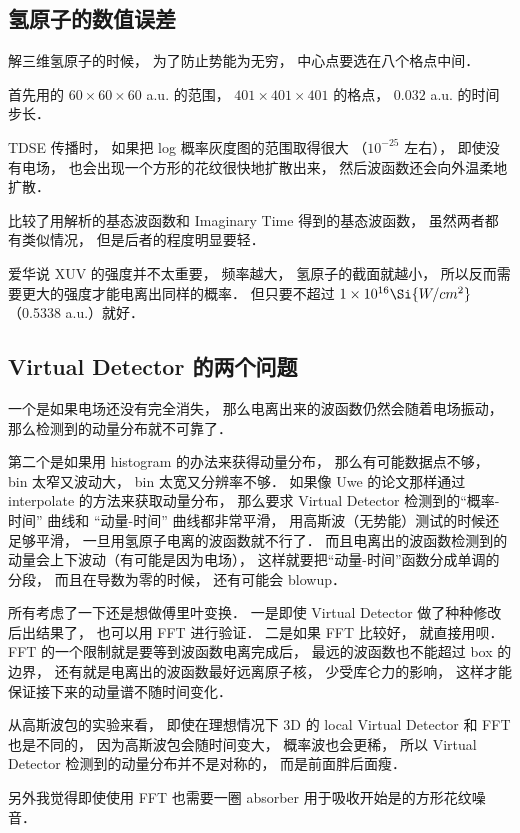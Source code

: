 
\subsection{氢原子的数值误差}
解三维氢原子的时候， 为了防止势能为无穷， 中心点要选在八个格点中间．

首先用的 $60\times 60\times 60$ a.u. 的范围， $401\times 401\times 401$ 的格点， $0.032$ a.u. 的时间步长．

TDSE 传播时， 如果把 log 概率灰度图的范围取得很大 （$10^{-25}$ 左右）， 即使没有电场， 也会出现一个方形的花纹很快地扩散出来， 然后波函数还会向外温柔地扩散．

比较了用解析的基态波函数和 Imaginary Time 得到的基态波函数， 虽然两者都有类似情况， 但是后者的程度明显要轻．

爱华说 XUV 的强度并不太重要， 频率越大， 氢原子的截面就越小， 所以反而需要更大的强度才能电离出同样的概率． 但只要不超过 $1\times 10^{16} \Si{W/cm^2}$ （0.5338 a.u.）就好．

\subsection{Virtual Detector 的两个问题}
一个是如果电场还没有完全消失， 那么电离出来的波函数仍然会随着电场振动， 那么检测到的动量分布就不可靠了．

第二个是如果用 histogram 的办法来获得动量分布， 那么有可能数据点不够， bin 太窄又波动大， bin 太宽又分辨率不够． 如果像 Uwe 的论文那样通过 interpolate 的方法来获取动量分布， 那么要求 Virtual Detector 检测到的“概率-时间” 曲线和 “动量-时间” 曲线都非常平滑， 用高斯波（无势能）测试的时候还足够平滑， 一旦用氢原子电离的波函数就不行了． 而且电离出的波函数检测到的动量会上下波动（有可能是因为电场）， 这样就要把“动量-时间”函数分成单调的分段， 而且在导数为零的时候， 还有可能会 blowup．

所有考虑了一下还是想做傅里叶变换． 一是即使 Virtual Detector 做了种种修改后出结果了， 也可以用 FFT 进行验证． 二是如果 FFT 比较好， 就直接用呗． FFT 的一个限制就是要等到波函数电离完成后， 最远的波函数也不能超过 box 的边界， 还有就是电离出的波函数最好远离原子核， 少受库仑力的影响， 这样才能保证接下来的动量谱不随时间变化．

从高斯波包的实验来看， 即使在理想情况下 3D 的 local Virtual Detector 和 FFT 也是不同的， 因为高斯波包会随时间变大， 概率波也会更稀， 所以 Virtual Detector 检测到的动量分布并不是对称的， 而是前面胖后面瘦．

另外我觉得即使使用 FFT 也需要一圈 absorber 用于吸收开始是的方形花纹噪音．


